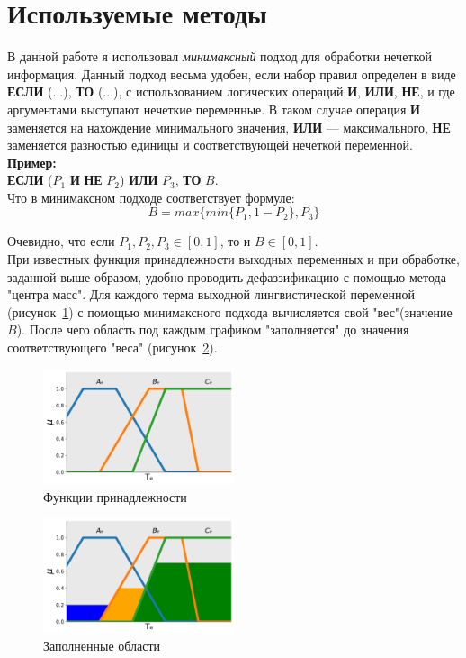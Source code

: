 \documentclass[a4paper,12pt]{article}
\begin{document}
	\section{Используемые методы}
	
	В данной работе я использовал \textit{минимаксный} подход для обработки нечеткой информация. Данный подход весьма удобен, если набор правил определен в виде \textbf{ЕСЛИ} (...), \textbf{ТО} (...), с использованием логических операций \textbf{И}, \textbf{ИЛИ}, \textbf{НЕ}, и где аргументами выступают нечеткие переменные. В таком случае операция \textbf{И} заменяется на нахождение минимального значения, \textbf{ИЛИ} — максимального, \textbf{НЕ} заменяется разностью единицы и соответствующей нечеткой переменной.\\
	
	\underline{\textbf{Пример:}}\\
	\textbf{ЕСЛИ} ($P_1$ \textbf{И} \textbf{НЕ} $P_2$) \textbf{ИЛИ} $P_3$, \textbf{ТО} $B$.\\
	Что в минимаксном подходе соответствует формуле:
	\[B=max\{min\{P_1, 1-P_2\}, P_3\}\]
	
	Очевидно, что если $P_1, P_2, P_3 \in [0,1]$, то и $B \in [0,1]$.
	\\
	При известных функция принадлежности выходных переменных и при обработке, заданной выше образом, удобно проводить дефаззификацию с помощью метода "центра масс". Для каждого терма выходной лингвистической переменной (рисунок~\ref{fig:2_1}) с помощью минимаксного подхода вычисляется свой "вес"(значение~$B$). После чего область под каждым графиком "заполняется" до значения соответствующего "веса" (рисунок~\ref{fig:2_2}). 
	
	\begin{figure}[h]
		\centering
		\includegraphics[width=0.5\textwidth]{Figure_2_1}
		\caption{Функции принадлежности}
		\label{fig:2_1}
	\end{figure}

	\begin{figure}[h]
		\centering
		\includegraphics[width=0.5\textwidth]{Figure_2_2}
		\caption{Заполненные области}
		\label{fig:2_2}
	\end{figure}
\end{document}
